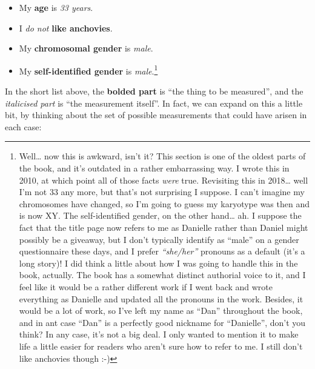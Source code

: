 \documentclass[
]{book}
\providecommand{\tightlist}{%
  \setlength{\itemsep}{0pt}\setlength{\parskip}{0pt}}
\begin{document}
\begin{itemize}
\tightlist
\item
  My \textbf{age} is \emph{33 years}.
\item
  I \emph{do not} \textbf{like anchovies}.
\item
  My \textbf{chromosomal gender} is \emph{male}.
\item
  My \textbf{self-identified gender} is \emph{male}.\footnote{Well\ldots{} now this is awkward, isn't it? This section is one of the oldest parts of the book, and it's outdated in a rather embarrassing way. I wrote this in 2010, at which point all of those facts \emph{were} true. Revisiting this in 2018\ldots{} well I'm not 33 any more, but that's not surprising I suppose. I can't imagine my chromosomes have changed, so I'm going to guess my karyotype was then and is now XY. The self-identified gender, on the other hand\ldots{} ah. I suppose the fact that the title page now refers to me as Danielle rather than Daniel might possibly be a giveaway, but I don't typically identify as ``male'' on a gender questionnaire these days, and I prefer \emph{``she/her''} pronouns as a default (it's a long story)! I did think a little about how I was going to handle this in the book, actually. The book has a somewhat distinct authorial voice to it, and I feel like it would be a rather different work if I went back and wrote everything as Danielle and updated all the pronouns in the work. Besides, it would be a lot of work, so I've left my name as ``Dan'' throughout the book, and in ant case ``Dan'' is a perfectly good nickname for ``Danielle'', don't you think? In any case, it's not a big deal. I only wanted to mention it to make life a little easier for readers who aren't sure how to refer to me. I still don't like anchovies though :-)}
\end{itemize}

In the short list above, the \textbf{bolded part} is ``the thing to be measured'', and the \emph{italicised part} is ``the measurement itself''. In fact, we can expand on this a little bit, by thinking about the set of possible measurements that could have arisen in each case:
\end{document}

